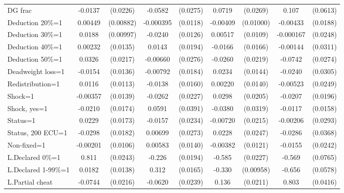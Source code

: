 \begin{tabular}{l|cccccc|cc}
DG frac         &  -0.0137         & (0.0226)&  -0.0582\sym{**} & (0.0275)&   0.0719\sym{***}& (0.0269)&    0.107\sym{*}  & (0.0613)\\
Deduction 20\%=1&  0.00449         &(0.00882)&-0.000395         & (0.0118)& -0.00409         &(0.01000)& -0.00433         & (0.0188)\\
Deduction 30\%=1&   0.0188\sym{*}  &(0.00997)&  -0.0240\sym{*}  & (0.0126)&  0.00517         & (0.0109)&-0.000167         & (0.0248)\\
Deduction 40\%=1&  0.00232         & (0.0135)&   0.0143         & (0.0194)&  -0.0166         & (0.0166)& -0.00144         & (0.0311)\\
Deduction 50\%=1&   0.0326         & (0.0217)& -0.00660         & (0.0276)&  -0.0260         & (0.0219)&  -0.0742\sym{***}& (0.0274)\\
Deadweight loss=1&  -0.0154         & (0.0136)& -0.00792         & (0.0184)&   0.0234         & (0.0144)&  -0.0240         & (0.0305)\\
Redistribution=1&   0.0116         & (0.0113)&  -0.0138         & (0.0160)&  0.00220         & (0.0140)& -0.00523         & (0.0249)\\
Shock=1         & -0.00357         & (0.0139)&  -0.0262         & (0.0227)&   0.0298         & (0.0205)&  -0.0207         & (0.0196)\\
Shock, yes=1    &  -0.0210         & (0.0174)&   0.0591         & (0.0391)&  -0.0380         & (0.0319)&  -0.0117         & (0.0158)\\
Status=1        &   0.0229         & (0.0173)&  -0.0157         & (0.0234)& -0.00720         & (0.0215)& -0.00206         & (0.0293)\\
Status, 200 ECU=1&  -0.0298         & (0.0182)&  0.00699         & (0.0273)&   0.0228         & (0.0247)&  -0.0286         & (0.0368)\\
Non-fixed=1     & -0.00201         & (0.0106)&  0.00583         & (0.0140)& -0.00382         & (0.0121)&  -0.0155         & (0.0242)\\
L.Declared 0\%=1&    0.811\sym{***}& (0.0243)&   -0.226\sym{***}& (0.0194)&   -0.585\sym{***}& (0.0227)&   -0.569\sym{***}& (0.0765)\\
L.Declared 1-99\%=1&   0.0182         & (0.0138)&    0.312\sym{***}& (0.0165)&   -0.330\sym{***}&(0.00958)&   -0.656\sym{***}& (0.0578)\\
L.Partial cheat &  -0.0744\sym{***}& (0.0216)&  -0.0620\sym{***}& (0.0239)&    0.136\sym{***}& (0.0211)&    0.803\sym{***}& (0.0416)\\

\end{tabular}
